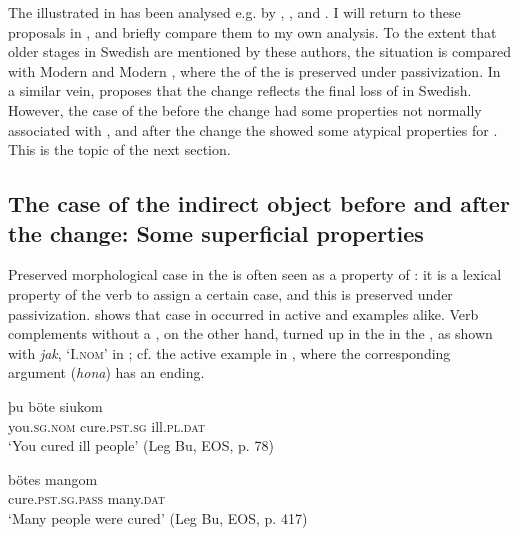 \documentclass[output=paper]{langscibook}
\begin{document}
The  illustrated in  has been analysed e.g. by \citet{HolmbergPlatzack1995}, \citet{Platzack2005,Platzack2006}, and \citet{HaddicanHolmberg2019}. I will return to these proposals in , and briefly compare them to my own analysis. To the extent that older stages in Swedish are mentioned by these authors, the situation is compared with Modern  and Modern , where the  of the  is preserved under passivization. In a similar vein, \citet{Falk1995, Falk1997} proposes that the change reflects the final loss of  in Swedish. However, the case of the  before the change had some properties not normally associated with , and after the change the  showed some atypical properties for . This is the topic of the next section.


\subsection{The case of the indirect object before and after the change: Some superficial properties}\label{sec:falk:2.2}


Preserved morphological case in the  is often seen as a property of : it is a lexical property of the verb to assign a certain case, and this is preserved under passivization.  shows that  case in  occurred in active  and   examples alike. Verb complements without a , on the other hand, turned up in the   in the , as shown with \textit{jak}, ‘I.\textsc{nom}’ in ; cf. the active example in , where the corresponding argument (\textit{hona}) has an  ending.

\ea%
    \label{ex:falk:3}
\ea\label{ex:falk:3a}
\gll þu              böte          siukom\\
      you.\textsc{sg.nom}  cure.\textsc{pst.sg}    ill.\textsc{pl}.\textsc{dat}\\
\glt ‘You cured ill people’ (Leg Bu, EOS, p. 78)

\ex\label{ex:falk:3b}
\gll bötes            mangom\\
      cure.\textsc{pst.sg.pass}  many.\textsc{dat}\\
\glt ‘Many people were cured’ (Leg Bu, EOS, p. 417)
\z
\ex%
    \label{ex:falk:4}
\end{document}
